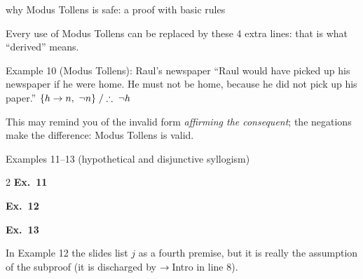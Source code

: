 \begin{nbexample}{why Modus Tollens is safe: a proof with basic rules}
\notinslides
\begin{fitchproof}
 \RPrem
{} \RPrem
\open
{} \RAss
{} 
 
\close
{} 
\end{fitchproof}
Every use of Modus Tollens can be replaced by these 4 extra lines: that is what ``derived''
means.
\end{nbexample}

\begin{nbexample}{Example 10 (Modus Tollens): Raul's newspaper}
``Raul would have picked up his newspaper if he were home. He must not be home, because he
did not pick up his paper.'' $\{h \rightarrow n,\ \neg n\} \;/\therefore\; \neg h$
\begin{fitchproof}
 \RPrem
{} \RPrem
{} 
\end{fitchproof}
This may remind you of the invalid form \emph{affirming the consequent}; the negations make
the difference: Modus Tollens is valid.
\end{nbexample}

\begin{nbexample}{Examples 11--13 (hypothetical and disjunctive syllogism)}
\begin{multicols}{2}
\textbf{Ex.~11}
\begin{fitchproof}
 \RPrem
{} \RPrem
{} \RPrem
{} \RPrem
{} 
\end{fitchproof}
\columnbreak
\textbf{Ex.~12}
\begin{fitchproof}
 \RPrem
{} \RPrem
{} \RPrem
\open
{} \RAss
{} 
 
 
\close
{} 
\end{fitchproof}
\end{multicols}
\textbf{Ex.~13}
\begin{fitchproof}
 \RPrem
{} \RPrem
\open
{} \RAss
{} 
 
 
 
\close
{} 
 
 
\end{fitchproof}

In Example 12 the slides list $j$ as a fourth premise, but it is really the assumption of
the subproof (it is discharged by $\rightarrow$\,Intro in line 8).
\end{nbexample}


